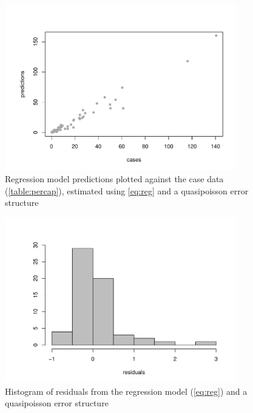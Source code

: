 \documentclass{article}
\begin{document}
\begin{figure}
\begin{center}
     \includegraphics[width=0.9\textwidth]{Cases_regmodel_prediction.pdf}
\end{center}
\caption{Regression model predictions plotted against the case data (\autoref{table:percap}), estimated using \autoref{eq:reg} and a quasipoisson error structure}
\label{fig:predict}
\end{figure}

\begin{figure}
\begin{center}
     \includegraphics[width=0.9\textwidth]{Cases_regmodel_resid.pdf}
\end{center}
\caption{Histogram of residuals from the regression model (\autoref{eq:reg}) and a quasipoisson error structure}
\label{fig:resid}
\end{figure}
\end{document}
